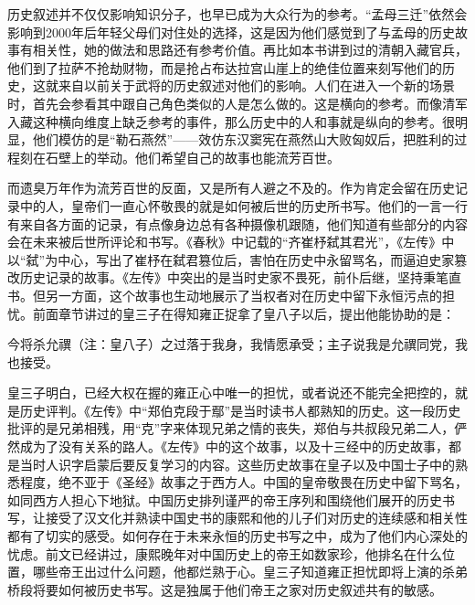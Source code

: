 
历史叙述并不仅仅影响知识分子，也早已成为大众行为的参考。“孟母三迁”依然会影响到2000年后年轻父母们对住处的选择，这是因为他们感觉到了与孟母的历史故事有相关性，她的做法和思路还有参考价值。再比如本书讲到过的清朝入藏官兵，他们到了拉萨不抢劫财物，而是抢占布达拉宫山崖上的绝佳位置来刻写他们的历史，这就来自以前关于武将的历史叙述对他们的影响。人们在进入一个新的场景时，首先会参看其中跟自己角色类似的人是怎么做的。这是横向的参考。而像清军入藏这种横向维度上缺乏参考的事件，那么历史中的人和事就是纵向的参考。很明显，他们模仿的是“勒石燕然”——效仿东汉窦宪在燕然山大败匈奴后，把胜利的过程刻在石壁上的举动。他们希望自己的故事也能流芳百世。



而遗臭万年作为流芳百世的反面，又是所有人避之不及的。作为肯定会留在历史记录中的人，皇帝们一直心怀敬畏的就是如何被后世的历史所书写。他们的一言一行有来自各方面的记录，有点像身边总有各种摄像机跟随，他们知道有些部分的内容会在未来被后世所评论和书写。《春秋》中记载的“齐崔杼弑其君光”，《左传》中以“弑”为中心，写出了崔杼在弑君篡位后，害怕在历史中永留骂名，而逼迫史家篡改历史记录的故事。《左传》中突出的是当时史家不畏死，前仆后继，坚持秉笔直书。但另一方面，这个故事也生动地展示了当权者对在历史中留下永恒污点的担忧。前面章节讲过的皇三子在得知雍正捉拿了皇八子以后，提出他能协助的是：



\begin{bookquote}今将杀允禩（注：皇八子）之过落于我身，我情愿承受；主子说我是允禩同党，我也接受。\end{bookquote}


皇三子明白，已经大权在握的雍正心中唯一的担忧，或者说还不能完全把控的，就是历史评判。《左传》中“郑伯克段于鄢”是当时读书人都熟知的历史。这一段历史批评的是兄弟相残，用“克”字来体现兄弟之情的丧失，郑伯与共叔段兄弟二人，俨然成为了没有关系的路人。《左传》中的这个故事，以及十三经中的历史故事，都是当时人识字启蒙后要反复学习的内容。这些历史故事在皇子以及中国士子中的熟悉程度，绝不亚于《圣经》故事之于西方人。中国的皇帝敬畏在历史中留下骂名，如同西方人担心下地狱。中国历史排列谨严的帝王序列和围绕他们展开的历史书写，让接受了汉文化并熟读中国史书的康熙和他的儿子们对历史的连续感和相关性都有了切实的感受。如何存在于未来永恒的历史书写之中，成为了他们内心深处的忧虑。前文已经讲过，康熙晚年对中国历史上的帝王如数家珍，他排名在什么位置，哪些帝王出过什么问题，他都烂熟于心。皇三子知道雍正担忧即将上演的杀弟桥段将要如何被历史书写。这是独属于他们帝王之家对历史叙述共有的敏感。


